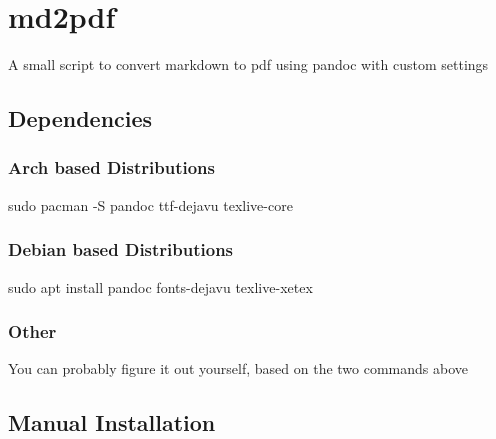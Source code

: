 \documentclass[
]{article}
\author{}
\date{}
\newenvironment{Shaded}{}{}
\newcommand{\AttributeTok}[1]{\textcolor[rgb]{0.49,0.56,0.16}{#1}}
\newcommand{\FunctionTok}[1]{\textcolor[rgb]{0.02,0.16,0.49}{#1}}
\newcommand{\NormalTok}[1]{#1}
\begin{document}
\hypertarget{md2pdf}{%
\section{md2pdf}\label{md2pdf}}

A small script to convert markdown to pdf using pandoc with custom
settings

\hypertarget{dependencies}{%
\subsection{Dependencies}\label{dependencies}}

\hypertarget{arch-based-distributions}{%
\subsubsection{Arch based
Distributions}\label{arch-based-distributions}}

\begin{Shaded}
\begin{Highlighting}[]
\FunctionTok{sudo}\NormalTok{ pacman }\AttributeTok{{-}S}\NormalTok{ pandoc ttf{-}dejavu texlive{-}core}
\end{Highlighting}
\end{Shaded}

\hypertarget{debian-based-distributions}{%
\subsubsection{Debian based
Distributions}\label{debian-based-distributions}}

\begin{Shaded}
\begin{Highlighting}[]
\FunctionTok{sudo}\NormalTok{ apt install pandoc fonts{-}dejavu texlive{-}xetex}
\end{Highlighting}
\end{Shaded}

\hypertarget{other}{%
\subsubsection{Other}\label{other}}

You can probably figure it out yourself, based on the two commands above

\hypertarget{manual-installation}{%
\subsection{Manual Installation}\label{manual-installation}}
\end{document}
